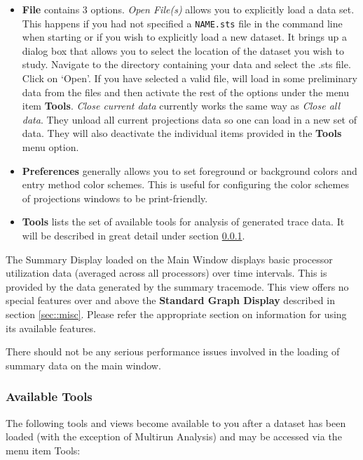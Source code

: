 \documentclass[10pt]{article}
\begin{document}
\begin{itemize}
\item
  {\bf File} contains 3 options. {\it Open File(s)} allows you to
  explicitly load a data set. This happens if you had not specified a
  {\tt NAME.sts} file in the command line when starting \projections{}
  or if you wish to explicitly load a new dataset. It brings up a
  dialog box that allows you to select the location of the dataset you
  wish to study. Navigate to the directory containing your data and
  select the .sts file.  Click on `Open'. If you have selected a valid
  file, \projections{} will load in some preliminary data from the
  files and then activate the rest of the options under the menu item
  {\bf Tools}. {\it Close current data} currently works the same way as 
  {\it Close all data}. They unload all current projections data so one can
  load in a new set of data. They will also deactivate the individual items
  provided in the {\bf Tools} menu option.
\item
  {\bf Preferences} generally allows you to set foreground or background
  colors and entry method color schemes. This is useful for configuring
  the color schemes of projections windows to be print-friendly.
\item
  {\bf Tools} lists the set of available tools for analysis of generated
  trace data. It will be described in great detail under section
  \ref{sec::available tools}.
\end{itemize}


The Summary Display loaded on the Main Window displays basic processor
utilization data (averaged across all processors) over time
intervals. This is provided by the data generated by the summary
tracemode. This view offers no special features over and above the
{\bf Standard Graph Display} described in section \ref{sec::misc}. 
Please refer the appropriate section on information for using
its available features.


There should not be any serious performance issues involved in the
loading of summary data on the main window.

\subsubsection{Available Tools}
\label{sec::available tools}

The following tools and views become available to you after a dataset
has been loaded (with the exception of Multirun Analysis) and may be
accessed via the menu item Tools:
\end{document}
